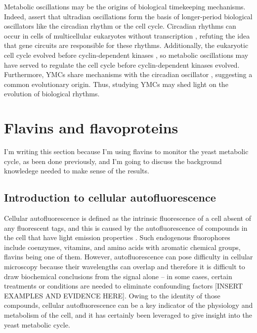 Metabolic oscillations may be the origins of biological timekeeping mechanisms.
Indeed, \citet{lloydRedoxRhythmicityClocks2007} assert that ultradian oscillations form the basis of longer-period biological oscillators like the circadian rhythm or the cell cycle. %
Circadian rhythms can occur in cells of multicellular eukaryotes without transcription \citep{oneillCircadianRhythmsPersist2011}, refuting the idea that gene circuits are responsible for these rhythms.
Additionally, the eukaryotic cell cycle evolved before cyclin-dependent kinases \citep{papagiannakisAutonomousMetabolicOscillations2017}, so metabolic oscillations may have served to regulate the cell cycle before cyclin-dependent kinases evolved.
Furthermore, YMCs share mechanisms with the circadian oscillator \citep{caustonMetabolicCyclesYeast2015,arataQuantitativeStudiesCellDivision2019}, suggesting a common evolutionary origin.
Thus, studying YMCs may shed light on the evolution of biological rhythms.

\section{Flavins and flavoproteins}
\label{sec:intro-flavin}
I'm writing this section because I'm using flavins to monitor the yeast metabolic cycle, as been done previously, and I'm going to discuss the background knowledege needed to make sense of the results.

\subsection{Introduction to cellular autofluorescence}
\label{subsec:intro-flavin-autofluo}

Cellular autofluorescence is defined as the intrinsic fluorescence of a cell absent of any fluorescent tags, and this is caused by the autofluorescence of compounds in the cell that have light emission properties \parencite{maslankaAutofluorescenceYeastSaccharomyces2018}.
Such endogenous fluorophores include coenzymes, vitamins, and amino acids with aromatic chemical groups, flavins being one of them.
However, autofluorescence can pose difficulty in cellular microscopy because their wavelengths can overlap and therefore it is difficult to draw biochemical conclusions from the signal alone -- in some cases, certain treatments or conditions are needed to eliminate confounding factors [INSERT EXAMPLES AND EVIDENCE HERE].
Owing to the identity of those compounds, cellular autofluorescence can be a key indicator of the physiology and metabolism of the cell, and it has certainly been leveraged to give insight into the yeast metabolic cycle.

